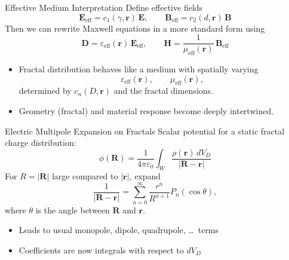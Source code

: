 \documentclass[11pt]{beamer}
\begin{document}
\begin{frame}{Effective Medium Interpretation}
Define effective fields
\begin{equation*}
  \bm E_{\text{eff}} = c_1(\gamma,\bm r)\, \bm E, \qquad
  \bm B_{\text{eff}} = c_2(d,\bm r)\, \bm B
\end{equation*}
Then we can rewrite Maxwell equations in a more standard form using
\begin{equation*}
  \bm D = \varepsilon_{\text{eff}}(\bm r)\, \bm E_{\text{eff}}, \qquad
  \bm H = \frac{1}{\mu_{\text{eff}}(\bm r)}\, \bm B_{\text{eff}}
\end{equation*}
\begin{itemize}
  \item Fractal distribution behaves like a medium with spatially varying
  \begin{equation*}
    \varepsilon_{\text{eff}}(\bm r), \qquad \mu_{\text{eff}}(\bm r),
  \end{equation*}
  determined by $c_n(D,\bm r)$ and the fractal dimensions.
  \item Geometry (fractal) and material response become deeply intertwined.
\end{itemize}
\end{frame}

\begin{frame}{Electric Multipole Expansion on Fractals}
Scalar potential for a static fractal charge distribution:
\begin{equation*}
  \phi(\bm R) =
  \frac{1}{4\pi \varepsilon_0}
  \int_W \frac{\rho(\bm r)\, dV_D}{\lvert \bm R - \bm r \rvert}
\end{equation*}
For $R = |\bm R|$ large compared to $|\bm r|$, expand
\begin{equation*}
  \frac{1}{\lvert \bm R - \bm r \rvert}
  = \sum_{n=0}^\infty \frac{r^n}{R^{n+1}} P_n(\cos\theta),
\end{equation*}
where $\theta$ is the angle between $\bm R$ and $\bm r$.
\begin{itemize}
  \item Leads to usual monopole, dipole, quadrupole, \dots\ terms
  \item Coefficients are now integrals with respect to $dV_D$
\end{itemize}
\end{frame}
\end{document}
